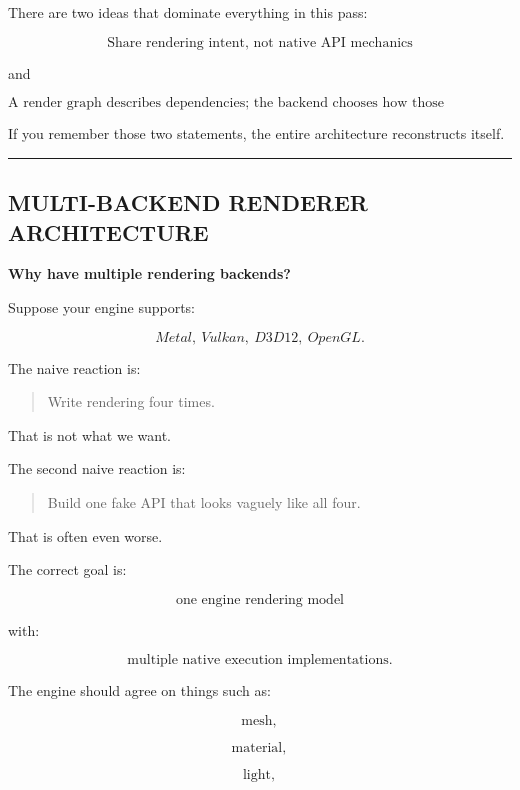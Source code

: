 There are two ideas that dominate everything in this pass:

\[
\boxed{
\text{Share rendering intent, not native API mechanics}
}
\]

and

\[
\boxed{
\text{A render graph describes dependencies;
the backend chooses how those dependencies become GPU commands.}
}
\]

If you remember those two statements, the entire architecture reconstructs itself.

\begin{center}\rule{0.5\linewidth}{0.5pt}\end{center}

\subsection{MULTI-BACKEND RENDERER ARCHITECTURE}\label{06-engine-ii-ch043-multi-backend-renderer-architecture}

\hypertarget{06-engine-ii-ch043-multi-backend-renderer-architecture}{}

\textbf{Why have multiple rendering backends?}

Suppose your engine supports:

\[
Metal,\ Vulkan,\ D3D12,\ OpenGL.
\]

The naive reaction is:

\begin{quote}
Write rendering four times.
\end{quote}

That is not what we want.

The second naive reaction is:

\begin{quote}
Build one fake API that looks vaguely like all four.
\end{quote}

That is often even worse.

The correct goal is:

\[
\boxed{
\text{one engine rendering model}
}
\]

with:

\[
\boxed{
\text{multiple native execution implementations}.
}
\]

The engine should agree on things such as:

\[
\text{mesh},
\]

\[
\text{material},
\]

\[
\text{light},
\]

